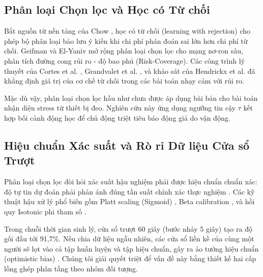 \documentclass[conference]{IEEEtran}
\begin{document}
\subsection{Phân loại Chọn lọc và Học có Từ chối}
Bắt nguồn từ nền tảng của Chow \cite{chow1970optimum}, học có từ chối (learning with rejection) cho phép bộ phân loại bảo lưu ý kiến khi chi phí phán đoán sai lớn hơn chi phí từ chối. Geifman và El-Yaniv \cite{geifman2017selective, geifman2019selectivenet} mở rộng phân loại chọn lọc cho mạng nơ-ron sâu, phân tích đường cong rủi ro - độ bao phủ (Risk-Coverage). Các công trình lý thuyết của Cortes et al. \cite{cortes2016learning}, Grandvalet et al. \cite{grandvalet2008support}, và khảo sát của Hendrickx et al. \cite{hendrickx2024machine} đã khẳng định giá trị của cơ chế từ chối trong các bài toán nhạy cảm với rủi ro.

Mặc dù vậy, phân loại chọn lọc hầu như chưa được áp dụng bài bản cho bài toán nhận diện stress từ thiết bị đeo. Nghiên cứu này ứng dụng ngưỡng tin cậy $\tau$ kết hợp bối cảnh động học để chủ động triệt tiêu báo động giả do vận động.

\subsection{Hiệu chuẩn Xác suất và Rò rỉ Dữ liệu Cửa sổ Trượt}
Phân loại chọn lọc đòi hỏi xác suất hậu nghiệm phải được hiệu chuẩn chuẩn xác: độ tự tin dự đoán phải phản ánh đúng tần suất chính xác thực nghiệm \cite{guo2017calibration}. Các kỹ thuật hậu xử lý phổ biến gồm Platt scaling (Sigmoid) \cite{platt1999probabilistic}, Beta calibration \cite{kull2017beta}, và hồi quy Isotonic phi tham số \cite{zadrozny2002transforming, niculescu2005predicting}.

Trong chuỗi thời gian sinh lý, cửa sổ trượt 60 giây (bước nhảy 5 giây) tạo ra độ gối đầu tới 91,7\%. Nếu chia dữ liệu ngẫu nhiên, các cửa sổ liền kề của cùng một người sẽ lọt vào cả tập huấn luyện và tập hiệu chuẩn, gây ra ảo tưởng hiệu chuẩn (optimistic bias) \cite{saeb2017need, little2017using}. Chúng tôi giải quyết triệt để vấn đề này bằng thiết kế hai cấp lồng ghép phân tầng theo nhóm đối tượng.
\end{document}
